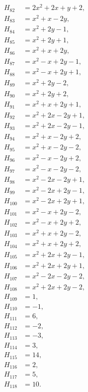 \documentclass[11pt]{article}
\begin{document}
\begin{align*}
H_{82}&=2x^{2}+2x+y+2,\\
H_{83}&=x^{2}+x-2y,\\
H_{84}&=x^{2}+2y-1,\\
H_{85}&=x^{2}+2y+1,\\
H_{86}&=x^{2}+x+2y,\\
H_{87}&=x^{2}-x+2y-1,\\
H_{88}&=x^{2}-x+2y+1,\\
H_{89}&=x^{2}+2y-2,\\
H_{90}&=x^{2}+2y+2,\\
H_{91}&=x^{2}+x+2y+1,\\
H_{92}&=x^{2}+2x-2y+1,\\
H_{93}&=x^{2}+2x-2y-1,\\
H_{94}&=x^{2}+x-2y+2,\\
H_{95}&=x^{2}+x-2y-2,\\
H_{96}&=x^{2}-x-2y+2,\\
H_{97}&=x^{2}-x-2y-2,\\
H_{98}&=x^{2}-2x-2y+1,\\
H_{99}&=x^{2}-2x+2y-1,\\
H_{100}&=x^{2}-2x+2y+1,\\
H_{101}&=x^{2}-x+2y-2,\\
H_{102}&=x^{2}-x+2y+2,\\
H_{103}&=x^{2}+x+2y-2,\\
H_{104}&=x^{2}+x+2y+2,\\
H_{105}&=x^{2}+2x+2y-1,\\
H_{106}&=x^{2}+2x+2y+1,\\
H_{107}&=x^{2}-2x-2y-2,\\
H_{108}&=x^{2}+2x+2y-2,\\
H_{109}&=1,\\
H_{110}&=-1,\\
H_{111}&=6,\\
H_{112}&=-2,\\
H_{113}&=-3,\\
H_{114}&=3,\\
H_{115}&=14,\\
H_{116}&=2,\\
H_{117}&=5,\\
H_{118}&=10.
\end{align*}
\end{document}

